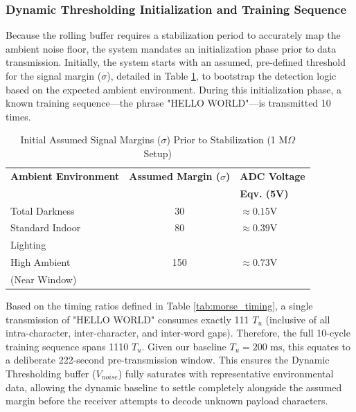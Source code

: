 \documentclass[conference]{IEEEtran}
\begin{document}

\subsubsection{Dynamic Thresholding Initialization and Training Sequence}
Because the rolling buffer requires a stabilization period to accurately map the ambient noise floor, the system mandates an initialization phase prior to data transmission. Initially, the system starts with an assumed, pre-defined threshold for the signal margin ($\sigma$), detailed in Table \ref{tab:assumed_thresholds}, to bootstrap the detection logic based on the expected ambient environment. During this initialization phase, a known training sequence—the phrase "HELLO WORLD"—is transmitted 10 times. 

\begin{table}[htbp]
\caption{Initial Assumed Signal Margins ($\sigma$) Prior to Stabilization (1 M$\Omega$ Setup)}
\label{tab:assumed_thresholds}
\centering
\begin{tabular}{|l|c|l|}
\hline
\textbf{Ambient Environment} & \textbf{Assumed Margin ($\sigma$)} & \textbf{ADC Voltage} \\ 
& & \textbf{Eqv. (5V)} \\ \hline
Total Darkness & 30 & $\approx 0.15\text{V}$ \\ \hline
Standard Indoor & 80 & $\approx 0.39\text{V}$ \\ 
Lighting & & \\ \hline
High Ambient & 150 & $\approx 0.73\text{V}$ \\ 
(Near Window)  & & \\ \hline
\end{tabular}
\end{table}

Based on the timing ratios defined in Table \ref{tab:morse_timing}, a single transmission of "HELLO WORLD" consumes exactly 111 $T_u$ (inclusive of all intra-character, inter-character, and inter-word gaps). Therefore, the full 10-cycle training sequence spans 1110 $T_u$. Given our baseline $T_u = 200\text{ ms}$, this equates to a deliberate 222-second pre-transmission window. This ensures the Dynamic Thresholding buffer ($V_{noise}$) fully saturates with representative environmental data, allowing the dynamic baseline to settle completely alongside the assumed margin before the receiver attempts to decode unknown payload characters.
\end{document}
